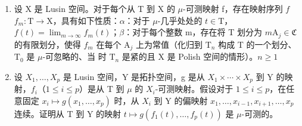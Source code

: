 \begin{enumerate}
\def\labelenumi{\alph{enumi})}
\item
  设 X 是 Lusin 空间。对于每个从 T 到 X 的 \(\mu\)-可测映射 f，存在映射序列 \(f\)\(f_m: \mathrm{T} \to \mathrm{X}\)，具有如下性质：\(\alpha\)：对于 \(\mu\)-几乎处处的 \(t \in \mathrm{T}\)，\(f(t) = \lim_{m \to \infty} f_m(t)\)；\(\beta\)：对于每个整数 m，存在将 T 划分为 \(m\)\(\mathrm{A}_j \in \mathfrak{C}\) 的有限划分，使得 \(f_m\) 在每个 \(\mathrm{A}_j\) 上为常值（化归到 \(\mathrm{T}_n\) 构成 T 的一个划分、\(\mathrm{T}_0\) 是 \(\mu\)-可忽略的、当  时 \(\mathrm{T}_n\) 是紧的且 X 是 Polish 空间的情形）。\(n \geqslant 1\)
\item
  设 \(X_{1},\ldots,X_{p}\) 是 Lusin 空间，Y 是拓扑空间，g 是从 \(X_{1}\times\cdots\times X_{p}\) 到 Y 的映射，\(f_{i}\)（\(1\leqslant i\leqslant p\)）是从 T 到 \(\mu\) 的 \(X_{i}\)-可测映射。假设对于 \(1\leqslant i\leqslant p\)，在任意固定 \(x_{i}\mapsto g(x_{1},\ldots,x_{p})\) 时，从 \(X_{i}\) 到 Y 的偏映射 \(x_{1},\ldots,x_{i-1},x_{i+1},\ldots,x_{p}\) 连续。证明从 T 到 Y 的映射 \(t\mapsto g(f_{1}(t),\ldots,f_{p}(t))\) 是 \(\mu\)-可测的。
\end{enumerate}


